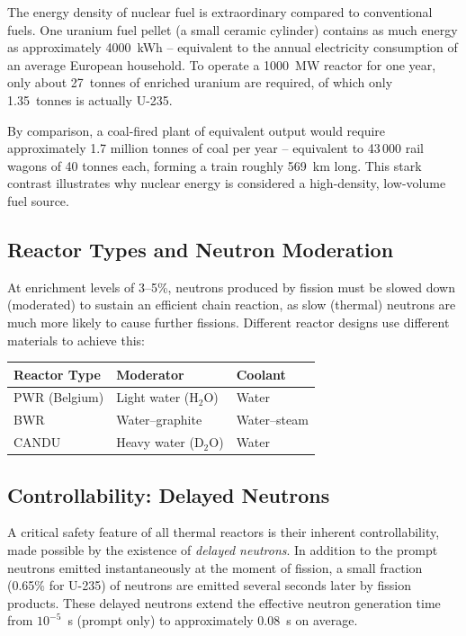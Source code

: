 The energy density of nuclear fuel is extraordinary compared to conventional fuels. One uranium fuel pellet (a small ceramic cylinder) contains as much energy as approximately 4000~kWh -- equivalent to the annual electricity consumption of an average European household. To operate a 1000~MW reactor for one year, only about 27~tonnes of enriched uranium are required, of which only 1.35~tonnes is actually U-235.

By comparison, a coal-fired plant of equivalent output would require approximately 1.7 million tonnes of coal per year -- equivalent to 43\,000 rail wagons of 40 tonnes each, forming a train roughly 569~km long. This stark contrast illustrates why nuclear energy is considered a high-density, low-volume fuel source.

\subsection{Reactor Types and Neutron Moderation}

At enrichment levels of 3--5\%, neutrons produced by fission must be slowed down (moderated) to sustain an efficient chain reaction, as slow (thermal) neutrons are much more likely to cause further fissions. Different reactor designs use different materials to achieve this:

\begin{center}
\begin{tabular}{lll}
\toprule
\textbf{Reactor Type} & \textbf{Moderator} & \textbf{Coolant} \\
\midrule
PWR (Belgium) & Light water (H$_2$O) & Water \\
BWR           & Water--graphite       & Water--steam \\
CANDU         & Heavy water (D$_2$O)  & Water \\
\bottomrule
\end{tabular}
\end{center}

\subsection{Controllability: Delayed Neutrons}

A critical safety feature of all thermal reactors is their inherent controllability, made possible by the existence of \textit{delayed neutrons}. In addition to the prompt neutrons emitted instantaneously at the moment of fission, a small fraction (0.65\% for U-235) of neutrons are emitted several seconds later by fission products. These delayed neutrons extend the effective neutron generation time from $10^{-5}$~s (prompt only) to approximately 0.08~s on average.

